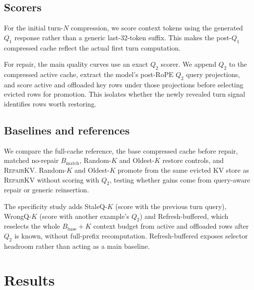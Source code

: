 \documentclass{article}
\newcommand{\repairkv}{\textsc{RepairKV}}
\newcommand{\bbase}{\ensuremath{B_{\mathrm{base}}}}
\newcommand{\bmatch}{\ensuremath{B_{\mathrm{match}}}}
\begin{document}
\subsection{Scorers}
For the initial turn-$N$ compression, we score context tokens using the generated $Q_1$ response rather than a generic last-32-token suffix. This makes the post-$Q_1$ compressed cache reflect the actual first turn computation.

For repair, the main quality curves use an exact $Q_2$ scorer. We append $Q_2$ to the compressed active cache, extract the model's post-RoPE $Q_2$ query projections, and score active and offloaded key rows under those projections before selecting evicted rows for promotion. This isolates whether the newly revealed turn signal identifies rows worth restoring.

\subsection{Baselines and references}
We compare the full-cache reference, the base compressed cache before repair, matched no-repair $\bmatch$, Random-$K$ and Oldest-$K$ restore controls, and \repairkv{}. Random-$K$ and Oldest-$K$ promote from the same evicted KV store as \repairkv{} without scoring with $Q_2$, testing whether gains come from query-aware repair or generic reinsertion. 

{The specificity study adds StaleQ-$K$ (score with the previous turn query), WrongQ-$K$ (score with another example's $Q_2$) and Refresh-buffered, which reselects the whole $\bbase+K$ context budget from active and offloaded rows after $Q_2$ is known, without full-prefix recomputation. Refresh-buffered exposes selector headroom rather than acting as a main baseline.}

\section{Results}
\label{sec:results}
\end{document}
